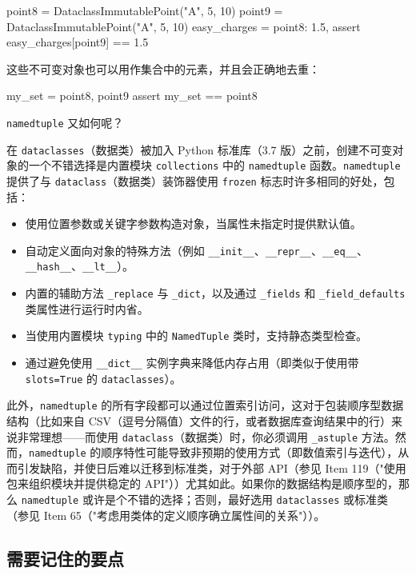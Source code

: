 \begin{codebox}[python]
point8 = DataclassImmutablePoint("A", 5, 10)
point9 = DataclassImmutablePoint("A", 5, 10)
easy_charges = {
    point8: 1.5,
}
assert easy_charges[point9] == 1.5
\end{codebox}

这些不可变对象也可以用作集合中的元素，并且会正确地去重：

\begin{codebox}[python]
my_set = {point8, point9}
assert my_set == {point8}
\end{codebox}

\texttt{namedtuple} 又如何呢？

在 \texttt{dataclasses}（数据类）被加入 Python 标准库（3.7 版）之前，创建不可变对象的一个不错选择是内置模块 \texttt{collections} 中的 \texttt{namedtuple} 函数。\texttt{namedtuple} 提供了与 \texttt{dataclass}（数据类）装饰器使用 \texttt{frozen} 标志时许多相同的好处，包括：

\begin{itemize}
\item 使用位置参数或关键字参数构造对象，当属性未指定时提供默认值。
\item 自动定义面向对象的特殊方法（例如 \texttt{\_\_init\_\_}、\texttt{\_\_repr\_\_}、\texttt{\_\_eq\_\_}、\texttt{\_\_hash\_\_}、\texttt{\_\_lt\_\_}）。
\item 内置的辅助方法 \texttt{\_replace} 与 \texttt{\_dict}，以及通过 \texttt{\_fields} 和 \texttt{\_field\_defaults} 类属性进行运行时内省。
\item 当使用内置模块 \texttt{typing} 中的 \texttt{NamedTuple} 类时，支持静态类型检查。
\item 通过避免使用 \texttt{\_\_dict\_\_} 实例字典来降低内存占用（即类似于使用带 \texttt{slots=True} 的 \texttt{dataclasses}）。
\end{itemize}

此外，\texttt{namedtuple} 的所有字段都可以通过位置索引访问，这对于包装顺序型数据结构（比如来自 CSV（逗号分隔值）文件的行，或者数据库查询结果中的行）来说非常理想——而使用 \texttt{dataclass}（数据类）时，你必须调用 \texttt{\_astuple} 方法。然而，\texttt{namedtuple} 的顺序特性可能导致非预期的使用方式（即数值索引与迭代），从而引发缺陷，并使日后难以迁移到标准类，对于外部 API（参见 Item 119（"使用包来组织模块并提供稳定的 API"））尤其如此。如果你的数据结构是顺序型的，那么 \texttt{namedtuple} 或许是个不错的选择；否则，最好选用 \texttt{dataclasses} 或标准类（参见 Item 65（"考虑用类体的定义顺序确立属性间的关系"））。

\subsection{需要记住的要点}


